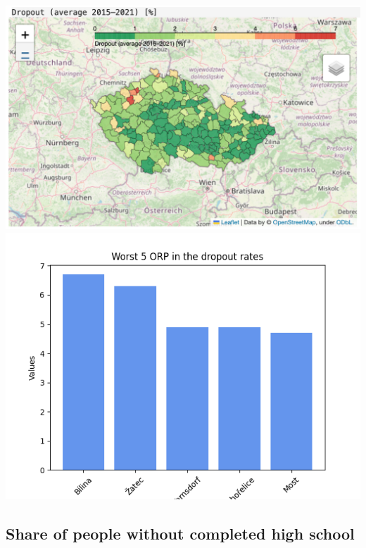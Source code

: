 \documentclass[a4paper, 12pt]{article}
\begin{document}
\begin{center}
    \includegraphics[width=.8\textwidth]{dropout.png}
    \includegraphics[width=.8\textwidth]{Worst 5 ORP in the dropout rates.png}
\end{center}
\subsection{Share of people without completed high school}
\end{document}
